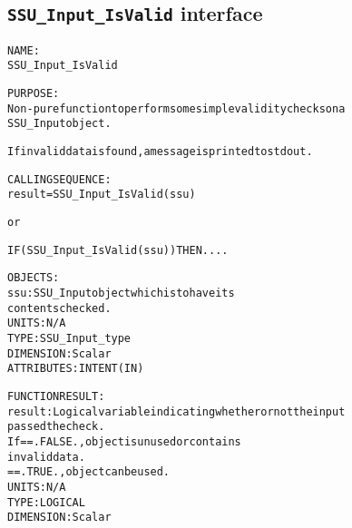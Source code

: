 \subsection{\texttt{SSU\_Input\_IsValid} interface}
  \label{sec:SSU_Input_IsValid_interface}
  \begin{alltt}
 
  NAME:
        SSU_Input_IsValid
 
  PURPOSE:
        Non-pure function to perform some simple validity checks on a
        SSU_Input object. 
 
        If invalid data is found, a message is printed to stdout.
 
  CALLING SEQUENCE:
        result = SSU_Input_IsValid( ssu )
 
          or
 
        IF ( SSU_Input_IsValid( ssu ) ) THEN....
 
  OBJECTS:
        ssu:       SSU_Input object which is to have its
                   contents checked.
                   UNITS:      N/A
                   TYPE:       SSU_Input_type
                   DIMENSION:  Scalar
                   ATTRIBUTES: INTENT(IN)
 
  FUNCTION RESULT:
        result:    Logical variable indicating whether or not the input
                   passed the check.
                   If == .FALSE., object is unused or contains
                                  invalid data.
                      == .TRUE.,  object can be used.
                   UNITS:      N/A
                   TYPE:       LOGICAL
                   DIMENSION:  Scalar
 
  \end{alltt}
